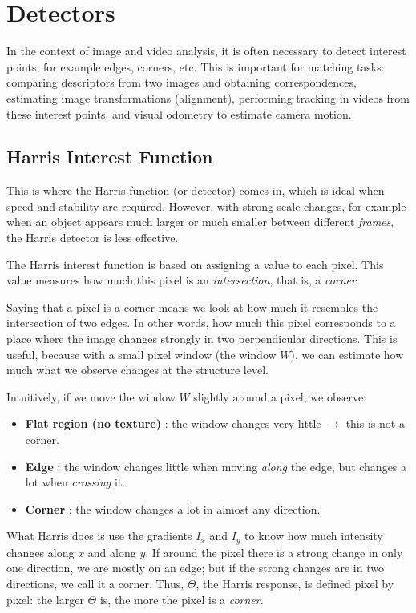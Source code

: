 \section{Detectors}

In the context of image and video analysis, it is often necessary
to detect interest points, for example edges, corners, etc.
This is important for matching tasks:
comparing descriptors from two images and obtaining correspondences,
estimating image transformations (alignment),
performing tracking in videos from these interest points,
and visual odometry to estimate camera motion.

\subsection{Harris Interest Function}

This is where the Harris function (or detector) comes in,
which is ideal when speed and stability are required.
However, with strong scale changes, for example when
an object appears much larger or much smaller
between different \emph{frames}, the Harris detector is less effective.

The Harris interest function is based on assigning a value to each pixel. This value measures
how much this pixel is an \emph{intersection}, that is, a \emph{corner}.

Saying that a pixel is a corner means we look at how much it resembles the intersection of two edges.
In other words, how much this pixel corresponds to a place where the image changes strongly in two
perpendicular directions. This is useful, because with a small pixel window (the window $W$), we can estimate
how much what we observe changes at the structure level.

Intuitively, if we move the window $W$ slightly around a pixel, we observe:
\begin{itemize}
    \item \textbf{Flat region (no texture)} : the window changes very little $\rightarrow$ this is not a corner.
    \item \textbf{Edge} : the window changes little when moving \emph{along} the edge, but changes a lot
    when \emph{crossing} it.
    \item \textbf{Corner} : the window changes a lot in almost any direction.
\end{itemize}

What Harris does is use the gradients $I_x$ and $I_y$ to know how much intensity changes
 along $x$ and along $y$.
If around the pixel there is a strong change in only one direction, we are mostly on an edge; but if
the strong changes are in two
directions, we call it a corner. Thus, $\Theta$, the Harris response, is defined pixel by pixel: the larger
$\Theta$ is, the more the pixel is a \emph{corner}.

